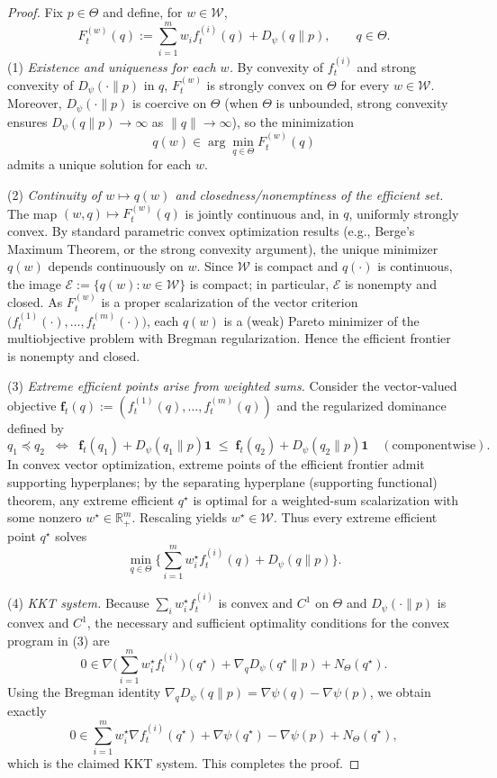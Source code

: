 \documentclass[11pt]{article}
\theoremstyle{plain}
\theoremstyle{definition}
\theoremstyle{remark}
\begin{document}
\begin{proof}
Fix $p\in\Theta$ and define, for $w\in\mathcal W$,
\[
F_t^{(w)}(q)
:=\sum_{i=1}^m w_i f_t^{(i)}(q)+D_\psi(q\|p),
\qquad q\in\Theta.
\]
(1) \emph{Existence and uniqueness for each $w$.}
By convexity of $f_t^{(i)}$ and strong convexity of $D_\psi(\cdot\|p)$ in $q$,
$F_t^{(w)}$ is strongly convex on $\Theta$ for every $w\in\mathcal W$.
Moreover, $D_\psi(\cdot\|p)$ is coercive on $\Theta$ 
(when $\Theta$ is unbounded, strong convexity ensures $D_\psi(q\|p)\to\infty$ as $\|q\|\to\infty$),
so the minimization
\[
q(w)\in\arg\min_{q\in\Theta} F_t^{(w)}(q)
\]
admits a unique solution for each $w$.

(2) \emph{Continuity of $w\mapsto q(w)$ and closedness/nonemptiness of the efficient set.}
The map $(w,q)\mapsto F_t^{(w)}(q)$ is jointly continuous and, in $q$, uniformly strongly convex.
By standard parametric convex optimization results (e.g., Berge’s Maximum Theorem, or the strong convexity argument), the unique minimizer $q(w)$ depends continuously on $w$. Since $\mathcal W$ is compact and $q(\cdot)$ is continuous, the image 
\(
\mathcal E:=\{q(w):w\in\mathcal W\}
\)
is compact; in particular, $\mathcal E$ is nonempty and closed. 
As $F_t^{(w)}$ is a proper scalarization of the vector criterion 
$\big(f_t^{(1)}(\cdot),\dots,f_t^{(m)}(\cdot)\big)$,
each $q(w)$ is a (weak) Pareto minimizer of the multiobjective problem with Bregman regularization.
Hence the efficient frontier is nonempty and closed.

(3) \emph{Extreme efficient points arise from weighted sums.}
Consider the vector-valued objective 
\(
\mathbf f_t(q):=(f_t^{(1)}(q),\dots,f_t^{(m)}(q))
\)
and the regularized dominance defined by
\[
q_1 \preceq q_2
\;\;\Longleftrightarrow\;\;
\mathbf f_t(q_1)+D_\psi(q_1\|p)\mathbf 1
\;\le\;
\mathbf f_t(q_2)+D_\psi(q_2\|p)\mathbf 1
\quad(\text{componentwise}).
\]
In convex vector optimization, extreme points of the efficient frontier admit supporting hyperplanes; by the separating hyperplane (supporting functional) theorem, any extreme efficient $q^\star$ is optimal for a weighted-sum scalarization with some nonzero $w^\star\in\mathbb R_+^m$. Rescaling yields $w^\star\in\mathcal W$. Thus every extreme efficient point $q^\star$ solves
\[
\min_{q\in\Theta}\Big\{\sum_{i=1}^m w_i^\star f_t^{(i)}(q)+D_\psi(q\|p)\Big\}.
\]

(4) \emph{KKT system.}
Because $\sum_i w_i^\star f_t^{(i)}$ is convex and $C^1$ on $\Theta$ and $D_\psi(\cdot\|p)$ is convex and $C^1$, the necessary and sufficient optimality conditions for the convex program in (3) are
\[
0\in \nabla\!\Big(\sum_{i=1}^m w_i^\star f_t^{(i)}\Big)(q^\star)
+\nabla_q D_\psi(q^\star\|p)
+N_\Theta(q^\star).
\]
Using the Bregman identity $\nabla_q D_\psi(q\|p)=\nabla\psi(q)-\nabla\psi(p)$,
we obtain exactly
\[
0\in\sum_{i=1}^m w_i^\star\nabla f_t^{(i)}(q^\star)
+\nabla\psi(q^\star)-\nabla\psi(p)
+N_\Theta(q^\star),
\]
which is the claimed KKT system. This completes the proof.
\end{proof}
\end{document}
